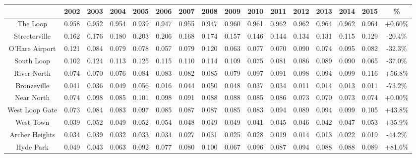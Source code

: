 \documentclass{article}
\theoremstyle{definition}
\theoremstyle{remark}
\begin{document}
\begin{adjustbox}{center}
\begin{tabular}{||c | c c c c c c c c c c c c c c | c||} 
 \hline
 & 2002 & 2003 & 2004 & 2005 & 2006 & 2007 & 2008 & 2009 & 2010 & 2011 & 2012 & 2013 & 2014 & 2015 & \%\\[0.5ex] 
 \hline\hline
The Loop       & 0.958 & 0.952 & 0.954 & 0.939 & 0.947 & 0.955 & 0.947 & 0.960 & 0.961 & 0.962 & 0.962 & 0.964 & 0.962 & 0.964 & +0.60\% \\
Streeterville  & 0.162 & 0.176 & 0.180 & 0.203 & 0.206 & 0.168 & 0.174 & 0.157 & 0.146 & 0.144 & 0.134 & 0.131 & 0.115 & 0.129 & -20.4\% \\
O'Hare Airport & 0.121 & 0.084 & 0.079 & 0.078 & 0.057 & 0.079 & 0.120 & 0.063 & 0.077 & 0.070 & 0.090 & 0.074 & 0.095 & 0.082 & -32.3\% \\
South Loop     & 0.102 & 0.124 & 0.113 & 0.125 & 0.115 & 0.110 & 0.114 & 0.109 & 0.075 & 0.081 & 0.086 & 0.089 & 0.090 & 0.065 & -37.0\% \\
River North    & 0.074 & 0.070 & 0.076 & 0.084 & 0.083 & 0.082 & 0.085 & 0.079 & 0.097 & 0.091 & 0.098 & 0.094 & 0.099 & 0.116 & +56.8\% \\
Bronzeville    & 0.041 & 0.036 & 0.049 & 0.056 & 0.016 & 0.044 & 0.050 & 0.048 & 0.037 & 0.034 & 0.011 & 0.014 & 0.013 & 0.011 & -73.2\% \\
Near North     & 0.074 & 0.098 & 0.085 & 0.101 & 0.098 & 0.091 & 0.088 & 0.088 & 0.085 & 0.086 & 0.073 & 0.070 & 0.073 & 0.074 & +0.00\% \\
West Loop Gate & 0.073 & 0.084 & 0.083 & 0.097 & 0.085 & 0.087 & 0.087 & 0.085 & 0.083 & 0.094 & 0.089 & 0.094 & 0.099 & 0.105 & +43.8\% \\
West Town      & 0.039 & 0.052 & 0.049 & 0.052 & 0.054 & 0.048 & 0.049 & 0.049 & 0.041 & 0.045 & 0.046 & 0.042 & 0.047 & 0.053 & +35.9\% \\
Archer Heights & 0.034 & 0.039 & 0.032 & 0.033 & 0.034 & 0.027 & 0.031 & 0.025 & 0.028 & 0.019 & 0.014 & 0.013 & 0.022 & 0.019 & -44.2\% \\
Hyde Park      & 0.049 & 0.043 & 0.063 & 0.092 & 0.077 & 0.080 & 0.100 & 0.067 & 0.096 & 0.087 & 0.094 & 0.088 & 0.088 & 0.089 & +81.6\% \\
 \hline
 \end{tabular}
\end{adjustbox}
\\
\end{document}
